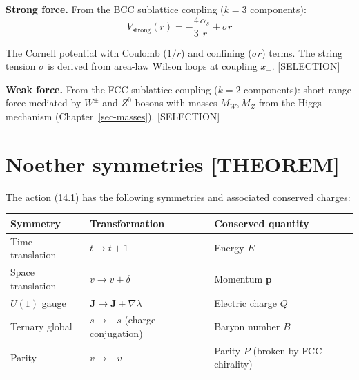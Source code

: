 \documentclass[
  11pt,
  letterpaper,
  twoside,
  openany]{book}
\makeatletter
\let\orig@section\section
\renewcommand{\section}{\needspace{8\baselineskip}\orig@section}
\makeatother
\begin{document}
\textbf{Strong force.} From the BCC sublattice coupling (\(k = 3\)
components): \[
V_{\text{strong}}(r) = -\frac{4}{3} \frac{\alpha_s}{r} + \sigma r
\tag{14.10}
\]

The Cornell potential with Coulomb (\(1/r\)) and confining
(\(\sigma r\)) terms. The string tension \(\sigma\) is derived from
area-law Wilson loops at coupling \(x_-\). {[}SELECTION{]}

\textbf{Weak force.} From the FCC sublattice coupling (\(k = 2\)
components): short-range force mediated by \(W^\pm\) and \(Z^0\) bosons
with masses \(M_W, M_Z\) from the Higgs mechanism
(Chapter~\ref{sec-masses}). {[}SELECTION{]}

\section{Noether symmetries
{[}THEOREM{]}}\label{noether-symmetries-theorem}

The action (14.1) has the following symmetries and associated conserved
charges:

\begin{longtable}[]{@{}
  >{\raggedright\arraybackslash}p{}
  >{\raggedright\arraybackslash}p{}
  >{\raggedright\arraybackslash}p{}@{}}
\toprule\noalign{}
\begin{minipage}[b]{\linewidth}\raggedright
Symmetry
\end{minipage} & \begin{minipage}[b]{\linewidth}\raggedright
Transformation
\end{minipage} & \begin{minipage}[b]{\linewidth}\raggedright
Conserved quantity
\end{minipage} \\
\midrule\noalign{}
\endhead
\bottomrule\noalign{}
\endlastfoot
Time translation & \(t \to t + 1\) & Energy \(E\) \\
Space translation & \(v \to v + \delta\) & Momentum \(\mathbf{p}\) \\
\(U(1)\) gauge & \(\mathbf{J} \to \mathbf{J} + \nabla \lambda\) &
Electric charge \(Q\) \\
Ternary global & \(s \to -s\) (charge conjugation) & Baryon number
\(B\) \\
Parity & \(v \to -v\) & Parity \(P\) (broken by FCC chirality) \\
\end{longtable}
\end{document}

